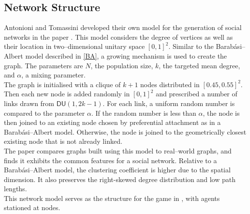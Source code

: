 \subsection{Network Structure}
Antonioni and Tomassini developed their own model for the generation of social networks in the paper \cite{RN51}. This model considers the degree of vertices as well as their location in two--dimensional unitary space $[0,1]^2$. Similar to the Barab\'{a}si--Albert model described in \ref{BA}, a growing mechanism is used to create the graph. The parameters are $N$, the population size, $k$, the targeted mean degree, and $\alpha$, a mixing parameter. \\

The graph is initialised with a clique of $k+1$ nodes distributed in $[0.45, 0.55]^2$. Then each new node is added randomly in $[0,1]^2$ and prescribed a number of links drawn from $\mathsf{DU}(1,2k-1)$. For each link, a uniform random number is compared to the parameter $\alpha$. If the random number is less than $\alpha$, the node is then joined to an existing node chosen by preferential attachment as in a Barab\'{a}si--Albert model. Otherwise, the node is joined to the geometrically closest existing node that is not already linked. \\

The paper \cite{RN51} compares graphs built using this model to real--world graphs, and finds it exhibits the common features for a social network. Relative to a Barab\'{a}si--Albert model, the clustering coefficient is higher due to the spatial dimension. It also preserves the right-skewed degree distribution and low path lengths. \\

This network model serves as the structure for the game in \cite{RN49}, with agents stationed at nodes.

